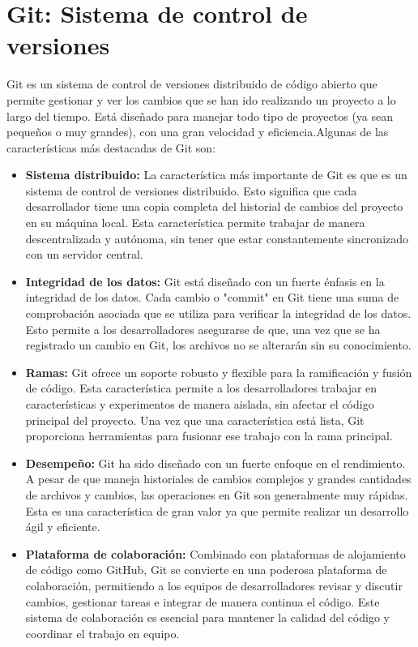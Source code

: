 \section{Git: Sistema de control de versiones}
Git es un sistema de control de versiones distribuido de código abierto que permite gestionar y ver los cambios que se han ido realizando un proyecto a lo largo del tiempo. Está diseñado para manejar todo tipo de proyectos (ya sean pequeños o muy grandes), con una gran velocidad y eficiencia.Algunas de las características más destacadas de Git son:
\begin{itemize}
    \item \textbf{Sistema distribuido:} La característica más importante de Git es que es un sistema de control de versiones distribuido. Esto significa que cada desarrollador tiene una copia completa del historial de cambios del proyecto en su máquina local. Esta característica permite trabajar de manera descentralizada y autónoma, sin tener que estar constantemente sincronizado con un servidor central.
    \item \textbf{Integridad de los datos:} Git está diseñado con un fuerte énfasis en la integridad de los datos. Cada cambio o "commit" en Git tiene una suma de comprobación asociada que se utiliza para verificar la integridad de los datos. Esto permite a los desarrolladores asegurarse de que, una vez que se ha registrado un cambio en Git, los archivos no se alterarán sin su conocimiento.
    \item \textbf{Ramas:} Git ofrece un soporte robusto y flexible para la ramificación y fusión de código. Esta característica permite a los desarrolladores trabajar en características y experimentos de manera aislada, sin afectar el código principal del proyecto. Una vez que una característica está lista, Git proporciona herramientas para fusionar ese trabajo con la rama principal.
    \item \textbf{Desempeño:} Git ha sido diseñado con un fuerte enfoque en el rendimiento. A pesar de que maneja historiales de cambios complejos y grandes cantidades de archivos y cambios, las operaciones en Git son generalmente muy rápidas. Esta es una característica de gran valor ya que permite realizar un desarrollo ágil y eficiente.
    \item \textbf{Plataforma de colaboración:} Combinado con plataformas de alojamiento de código como GitHub, Git se convierte en una poderosa plataforma de colaboración, permitiendo a los equipos de desarrolladores revisar y discutir cambios, gestionar tareas e integrar de manera continua el código. Este sistema de colaboración es esencial para mantener la calidad del código y coordinar el trabajo en equipo.
\end{itemize}
